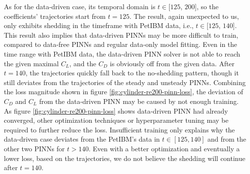 As for the data-driven case, its temporal domain is $t\in[125$, $200]$, so the coefficients' trajectories start from $t=125$.
The result, again unexpected to us, only exhibits shedding in the timeframe with PetIBM data, i.e., $t\in[125$, $140]$.
This result also implies that data-driven PINNs may be more difficult to train, compared to data-free PINNs and regular data-only model fitting.
Even in the time range with PetIBM data, the data-driven PINN solver is not able to reach the given maximal $C_L$, and the $C_D$ is obviously off from the given data.
After $t=140$, the trajectories quickly fall back to the no-shedding pattern, though it still deviates from the trajectories of the steady and unsteady PINNs.
Combining the loss magnitude shown in figure \ref{fig:cylinder-re200-pinn-loss}, the deviation of $C_D$ and $C_L$ from the data-driven PINN may be caused by not enough training.
As figure \ref{fig:cylinder-re200-pinn-loss} shows data-driven PINN had already converged, other optimization techniques or hyperparameter tuning may be required to further reduce the loss.
Insufficient training only explains why the data-driven case deviates from the PetIBM's data in $t \in [125, 140]$ and from the other two PINNs for $t > 140$.
Even with a better optimization and eventually a lower loss, based on the trajectories, we do not believe the shedding will continue after $t=140$.

